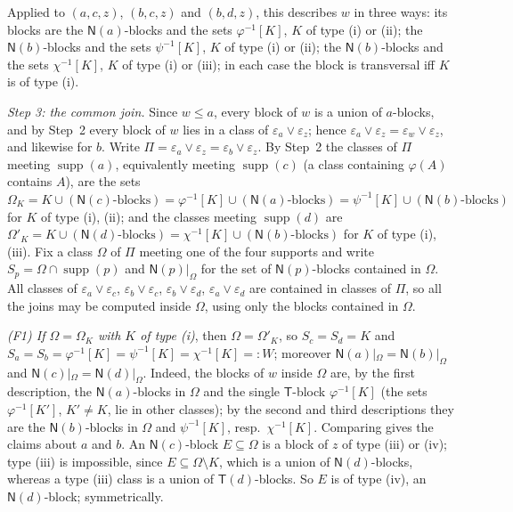 \documentclass[11pt]{amsart}
\theoremstyle{definition}
\newcommand{\supp}{\operatorname{supp}}
\newcommand{\T}{\mathsf{T}}
\newcommand{\N}{\mathsf{N}}
\begin{document}
Applied to $(a,c,z)$, $(b,c,z)$ and $(b,d,z)$, this describes $w$ in three ways: its blocks are the $\N(a)$-blocks and the sets $\varphi^{-1}[K]$, $K$ of type (i) or (ii); the $\N(b)$-blocks and the sets $\psi^{-1}[K]$, $K$ of type (i) or (ii); the $\N(b)$-blocks and the sets $\chi^{-1}[K]$, $K$ of type (i) or (iii); in each case the block is transversal iff $K$ is of type (i).

\smallskip
\emph{Step 3: the common join.} Since $w\le a$, every block of $w$ is a union of $a$-blocks, and by Step~2 every block of $w$ lies in a class of $\varepsilon_a\vee\varepsilon_z$; hence $\varepsilon_a\vee\varepsilon_z=\varepsilon_w\vee\varepsilon_z$, and likewise for $b$. Write $\Pi=\varepsilon_a\vee\varepsilon_z=\varepsilon_b\vee\varepsilon_z$. By Step~2 the classes of $\Pi$ meeting $\supp(a)$, equivalently meeting $\supp(c)$ (a class containing $\varphi(A)$ contains $A$), are the sets $\Omega_K=K\cup(\N(c)\text{-blocks})=\varphi^{-1}[K]\cup(\N(a)\text{-blocks})=\psi^{-1}[K]\cup(\N(b)\text{-blocks})$ for $K$ of type (i), (ii); and the classes meeting $\supp(d)$ are $\Omega'_K=K\cup(\N(d)\text{-blocks})=\chi^{-1}[K]\cup(\N(b)\text{-blocks})$ for $K$ of type (i), (iii). Fix a class $\Omega$ of $\Pi$ meeting one of the four supports and write $S_p=\Omega\cap\supp(p)$ and $\N(p)|_\Omega$ for the set of $\N(p)$-blocks contained in $\Omega$. All classes of $\varepsilon_a\vee\varepsilon_c$, $\varepsilon_b\vee\varepsilon_c$, $\varepsilon_b\vee\varepsilon_d$, $\varepsilon_a\vee\varepsilon_d$ are contained in classes of $\Pi$, so all the joins may be computed inside $\Omega$, using only the blocks contained in $\Omega$.

\emph{(F1) If $\Omega=\Omega_K$ with $K$ of type \textup{(i)}}, then $\Omega=\Omega'_K$, so $S_c=S_d=K$ and $S_a=S_b=\varphi^{-1}[K]=\psi^{-1}[K]=\chi^{-1}[K]=:W$; moreover $\N(a)|_\Omega=\N(b)|_\Omega$ and $\N(c)|_\Omega=\N(d)|_\Omega$. Indeed, the blocks of $w$ inside $\Omega$ are, by the first description, the $\N(a)$-blocks in $\Omega$ and the single $\T$-block $\varphi^{-1}[K]$ (the sets $\varphi^{-1}[K']$, $K'\ne K$, lie in other classes); by the second and third descriptions they are the $\N(b)$-blocks in $\Omega$ and $\psi^{-1}[K]$, resp.\ $\chi^{-1}[K]$. Comparing gives the claims about $a$ and $b$. An $\N(c)$-block $E\subseteq\Omega$ is a block of $z$ of type (iii) or (iv); type (iii) is impossible, since $E\subseteq\Omega\setminus K$, which is a union of $\N(d)$-blocks, whereas a type (iii) class is a union of $\T(d)$-blocks. So $E$ is of type (iv), an $\N(d)$-block; symmetrically.
\end{document}
